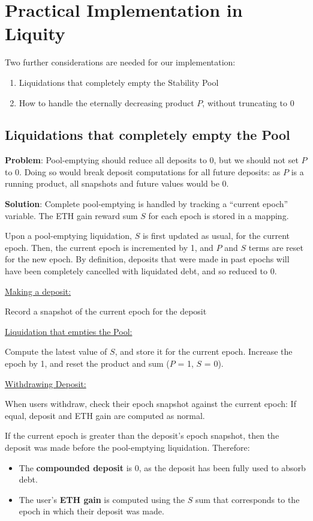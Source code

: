 \documentclass[reqno]{article}
\begin{document}
\bigskip
\section{Practical Implementation in Liquity}
Two further considerations are needed for our implementation:
\begin{enumerate}
    \item Liquidations that completely empty the Stability Pool
    \item How to handle the eternally decreasing product {$P$}, without truncating to 0
\end{enumerate}

\bigskip
\subsection{Liquidations that completely empty the Pool}

\bigskip
\textbf{Problem}: Pool-emptying should reduce all deposits to 0, but we should not set {$P$} to 0. Doing so would break deposit computations for all future deposits: as {$P$} is a running product, all snapshots and future values would be 0.

\bigskip
\textbf{Solution}: Complete pool-emptying is handled by tracking a “current epoch” variable. The ETH gain reward sum {$S$} for each epoch is stored in a mapping.

\bigskip
Upon a pool-emptying liquidation, {$S$} is first updated as usual, for the current epoch. Then, the current epoch is incremented by 1, and {$P$} and {$S$} terms are reset for the new epoch. By definition, deposits that were made in past epochs will have been completely cancelled with liquidated debt, and so reduced to 0.

\bigskip
\underline{Making a deposit:}

Record a snapshot of the current epoch for the deposit

\bigskip
\underline{Liquidation that empties the Pool:}

Compute the latest value of {$S$}, and store it for the current epoch.
Increase the epoch by 1, and reset the product and sum ({$P$} = 1, {$S$} = 0).

\bigskip
\underline{Withdrawing Deposit:}

When users withdraw, check their epoch snapshot against the current epoch: If equal, deposit and ETH gain are computed as normal.

\bigskip
If the current epoch is greater than the deposit’s epoch snapshot, then the deposit was made before the pool-emptying liquidation. Therefore:
\begin{itemize}
    \item The \textbf{compounded deposit} is 0, as the deposit has been fully used to absorb debt.
    \item The user’s \textbf{ETH gain} is computed using the $S$ sum that corresponds to the epoch in which their deposit was made.
\end{itemize}
\end{document}
